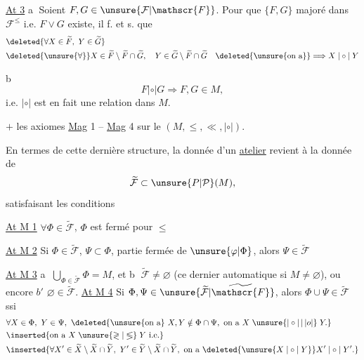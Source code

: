 \uline{At 3} \textcircled{a} Soient $F,G\in\unsure{\mathcal{F}|\mathscr{F}}$. Pour que $\{F,G\}$ majoré dans $\mathcal{F}^{\leq}$ i.e. $F\vee G$ existe, il f. et s. que
\[
\begin{aligned}
&\deleted{\forall X\in\widetilde{F},\ Y\in\widetilde{G}}\\
&\deleted{\unsure{\forall}}X\in\widetilde{F}\setminus\widetilde{F}\cap\widetilde{G},\quad Y\in\widetilde{G}\setminus\widetilde{F}\cap\widetilde{G}\quad\deleted{\unsure{\text{on a}}}\Longrightarrow X\mathrel{|\circ|}Y
\end{aligned}
\]
\par
\textcircled{b} 
\[
F\mathrel{|\circ|}G\Longrightarrow F,G\in M,
\]
i.e. $|\circ|$ est en fait une relation dans $M$.


$+$ les axiomes \uline{Mag} 1 -- \uline{Mag} 4 sur le $(M,\leq,\ll,|\circ|)$.

En termes de cette dernière structure, la donnée d'un \uline{atelier} revient à la donnée de
\[
\widetilde{\mathcal{F}}\subset\unsure{P|\mathcal{P}}(M),
\]
satisfaisant les conditions

\uline{At M 1} $\forall\Phi\in\widetilde{\mathcal{F}}$, $\Phi$ est fermé pour $\leq$

\uline{At M 2} Si $\Phi\in\widetilde{\mathcal{F}}$, $\Psi\subset\Phi$,  partie fermée de $\unsure{\varphi|\Phi}$, alors $\Psi\in\widetilde{\mathcal{F}}$

\uline{At M 3} \textcircled{a} $\displaystyle\bigcup_{\Phi\in\widetilde{\mathcal{F}}}\Phi=M$, et \textcircled{b} $\widetilde{\mathcal{F}}\ne\varnothing$ (ce dernier automatique si $M\ne\varnothing$), ou encore \textcircled{$b'$} $\varnothing\in\widetilde{\mathcal{F}}$.
\uline{At M 4} Si $\Phi,\Psi\in\unsure{\widetilde{\mathcal{F}}|\widetilde{\mathscr{F}}}$, alors $\Phi\cup\Psi\in\widetilde{\mathcal{F}}$ ssi
\[
\begin{aligned}
&\forall X\in\Phi,\ Y\in\Psi,\ \deleted{\unsure{\text{on a}}\ X,Y\notin\Phi\cap\Psi,\ \text{on a }X\mathrel{\unsure{|\circ|\,|\,|o|}}Y.}\\
&\inserted{\text{on a }X\mathrel{\unsure{\gtrless|\lessgtr}}Y\ \text{i.e.}}\\
&\inserted{\forall X'\in\widetilde{X}\setminus\widetilde{X}\cap\widetilde{Y},\ Y'\in\widetilde{Y}\setminus\widetilde{X}\cap\widetilde{Y},\ \text{on a }\deleted{\unsure{X\mathrel{|\circ|}Y}}X'\mathrel{|\circ|}Y'.}
\end{aligned}
\]

